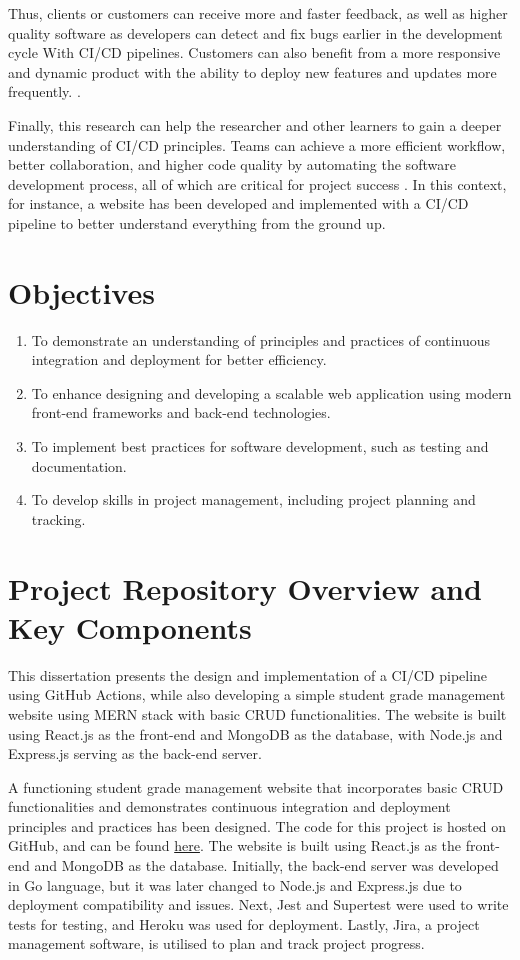 Thus, clients or customers can receive more and faster feedback, as well as higher quality software as developers can detect and fix bugs earlier in the development cycle With CI/CD pipelines. Customers can also benefit from a more responsive and dynamic product with the ability to deploy new features and updates more frequently. \cite{chen, leppanenetal}.

Finally, this research can help the researcher and other learners to gain a deeper understanding of CI/CD principles. Teams can achieve a more efficient workflow, better collaboration, and higher code quality by automating the software development process, all of which are critical for project success \cite{sander}. In this context, for instance, a website has been developed and implemented with a CI/CD pipeline to better understand everything from the ground up.

\section{Objectives}
\begin{enumerate}
  \item To demonstrate an understanding of principles and practices of continuous integration and deployment for better efficiency.
  \item To enhance designing and developing a scalable web application using modern front-end frameworks and back-end technologies.
  \item To implement best practices for software development, such as testing and documentation.
  \item To develop skills in project management, including project planning and tracking.
\end{enumerate}

\section{Project Repository Overview and Key Components}
This dissertation presents the design and implementation of a CI/CD pipeline using GitHub Actions, while also developing a simple student grade management website using MERN stack with basic CRUD functionalities. The website is built using React.js as the front-end and MongoDB as the database, with Node.js and Express.js serving as the back-end server.

A functioning student grade management website that incorporates basic CRUD functionalities and demonstrates continuous integration and deployment principles and practices has been designed. The code for this project is hosted on GitHub, and can be found \href{https://github.com/gabhang/final-year-project}{here}. The website is built using React.js as the front-end and MongoDB as the database. Initially, the back-end server was developed in Go language, but it was later changed to Node.js and Express.js due to deployment compatibility and issues. Next, Jest and Supertest were used to write tests for testing, and Heroku was used for deployment. Lastly, Jira, a project management software, is utilised to plan and track project progress.

